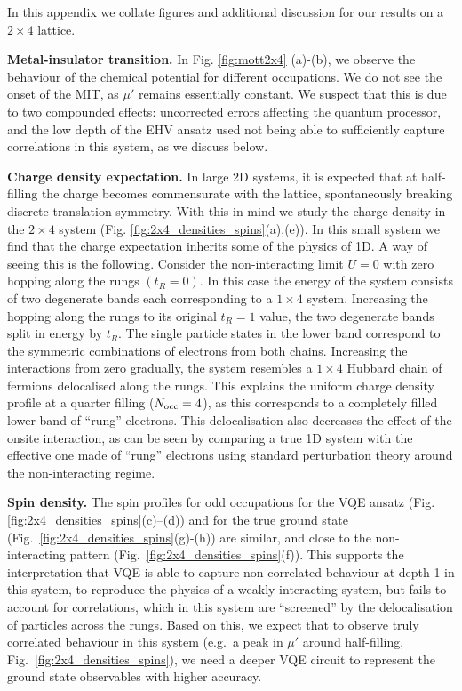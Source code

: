 \documentclass[aps,prb,twoside,superscriptaddress,longbibliography,nofootinbib,floatfix, notitlepage,twocolumn]{revtex4-1}
\newcommand{\Nocc}{N_{\rm{occ}}}
\begin{document}
{In this appendix we collate figures and additional discussion for our results on a $2\times 4$ lattice.

\textbf{Metal-insulator transition.} In Fig. \ref{fig:mott2x4} (a)-(b), we observe the behaviour of the chemical potential for different occupations. We do not see the onset of the MIT, as $\mu'$ remains essentially constant. We suspect that this is due to two compounded effects: uncorrected errors affecting the quantum processor, and the low depth of the EHV ansatz used not being able to sufficiently capture correlations in this system, as we discuss below.

\textbf{Charge density expectation.} In large 2D systems, it is expected that at half-filling the charge becomes commensurate with the lattice, spontaneously breaking discrete translation symmetry. With this in mind we study the charge density in the $2\times 4$ system (Fig. \ref{fig:2x4_densities_spins}(a),(e)). In this small system we find that the charge expectation inherits some of the physics of 1D. A way of seeing this is the following. Consider the non-interacting limit $U=0$ with zero hopping along the rungs $(t_R=0)$. In this case the energy of the system consists of two degenerate bands each corresponding to a $1\times 4$ system. Increasing the hopping along the rungs to its original $t_R=1$ value, the two degenerate bands split in energy by $t_R$. The single particle states in the lower band correspond to the symmetric combinations of electrons from both chains. Increasing the interactions from zero gradually, the system resembles a $1\times 4$ Hubbard chain of fermions delocalised along the rungs. This explains the uniform charge density profile at a quarter filling ($\Nocc=4$), as this corresponds to a completely filled lower band of ``rung'' electrons. This delocalisation also decreases the effect of the onsite interaction, as can be seen  by comparing a true 1D system with the effective one made of ``rung'' electrons using standard perturbation theory around the non-interacting regime.

\textbf{Spin density.} The spin profiles for odd occupations for the VQE ansatz (Fig.~ \ref{fig:2x4_densities_spins}(c)--(d)) and for the true ground state (Fig.~\ref{fig:2x4_densities_spins}(g)-(h)) are similar, and close to the non-interacting pattern (Fig.~\ref{fig:2x4_densities_spins}(f)). This supports the interpretation that VQE is able to capture non-correlated behaviour at depth 1 in this system, to reproduce the physics of a weakly interacting system, but fails to account for correlations, which in this system are ``screened'' by the delocalisation of particles across the rungs. Based on this, we expect that to observe truly correlated behaviour in this system (e.g.\ a peak in $\mu'$ around half-filling, Fig.~\ref{fig:2x4_densities_spins}), we need a deeper VQE circuit to represent the ground state observables with higher accuracy.

}
\end{document}
